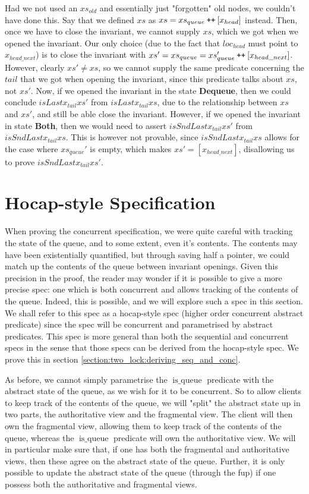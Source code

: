 \documentclass[twoside,11pt,openright]{report}
\newcommand{\isqueue}{\operatorname{is\_queue}}
\newcommand{\DequeueState}{\textbf{Dequeue}}
\newcommand{\BothState}{\textbf{Both}}
\newcommand\catenate{\mathbin{\text{\ttfamily\upshape ++}}}
\begin{document}
Had we not used an $xs_{old}$ and essentially just "forgotten" old nodes, we couldn't have done this. Say that we defined $xs$ as $xs = xs_{queue} \catenate [x_{head}]$ instead. Then, once we have to close the invariant, we cannot supply $xs$, which we got when we opened the invariant. Our only choice (due to the fact that $loc_{head}$ must point to $x_{head\_next}$) is to close the invariant with $xs' = xs_{queue} = xs_{queue}' \catenate [x_{head\_next}]$. However, clearly $xs' \neq xs$, so we cannot supply the same predicate concerning the $tail$ that we got when opening the invariant, since this predicate talks about $xs$, not $xs'$. Now, if we opened the invariant in the state \DequeueState{}, then we could conclude $isLast x_{tail} xs'$ from $isLast x_{tail} xs$, due to the relationship between $xs$ and $xs'$, and still be able close the invariant. However, if we opened the invariant in state \BothState{}, then we would need to assert $isSndLast x_{tail} xs'$ from $isSndLast x_{tail} xs$. This is however not provable, since $isSndLast x_{tail} xs$ allows for the case where $xs_{queue}'$ is empty, which makes $xs' = [x_{head\_next}]$, disallowing us to prove $isSndLast x_{tail} xs'$.


\section{Hocap-style Specification}

When proving the concurrent specification, we were quite careful with tracking the state of the queue, and to some extent, even it's contents. The contents may have been existentially quantified, but through saving half a pointer, we could match up the contents of the queue between invariant openings. Given this precision in the proof, the reader may wonder if it is possible to give a more precise spec: one which is both concurrent and allows tracking of the contents of the queue. Indeed, this is possible, and we will explore such a spec in this section. We shall refer to this spec as a hocap-style spec (higher order concurrent abstract predicate) since the spec will be concurrent and parametrised by abstract predicates. This spec is more general than both the sequential and concurrent specs in the sense that those specs can be derived from the hocap-style spec. We prove this in section \ref{section:two_lock:deriving_seq_and_conc}.

As before, we cannot simply parametrise the $\isqueue$ predicate with the abstract state of the queue, as we wish for it to be concurrent. So to allow clients to keep track of the contents of the queue, we will "split" the abstract state up in two parts, the authoritative view and the fragmental view. The client will then own the fragmental view, allowing them to keep track of the contents of the queue, whereas the $\isqueue$ predicate will own the authoritative view. We will in particular make sure that, if one has both the fragmental and authoritative views, then these agree on the abstract state of the queue. Further, it is only possible to update the abstract state of the queue (through the fup) if one possess both the authoritative and fragmental views.
\end{document}
